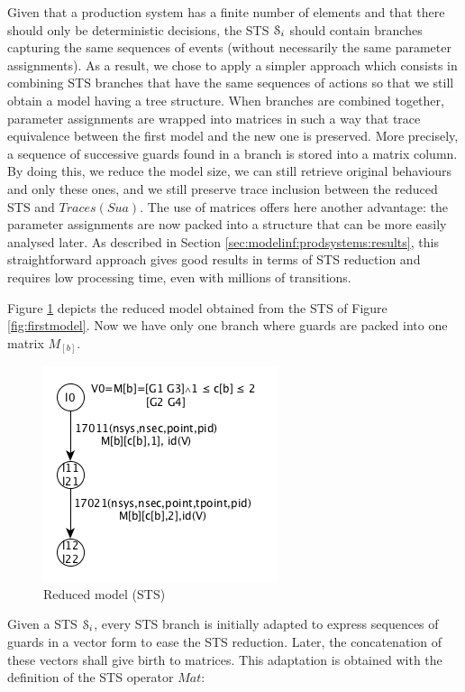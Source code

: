 Given that a production system has a finite number of elements
and that there should only be deterministic decisions, the STS
$\EuScript{S}_i$ should contain branches capturing the same
sequences of events (without necessarily the same parameter
assignments).  As a result, we chose to apply a simpler approach
which consists in combining STS branches that have the same
sequences of actions so that we still obtain a model having a
tree structure. When branches are combined together, parameter
assignments are wrapped into matrices in such a way that trace
equivalence between the first model and the new one is preserved.
More precisely, a sequence of successive guards found in a branch
is stored into a matrix column. By doing this, we reduce the
model size, we can still retrieve original behaviours and only
these ones, and we still preserve trace inclusion between the
reduced STS and $Traces(Sua)$.
The use of matrices offers here another advantage: the parameter
assignments are now packed into a structure that can be more
easily analysed later. As described in Section
\ref{sec:modelinf:prodsystems:results}, this straightforward
approach gives good results in terms of STS reduction and
requires low processing time, even with millions of transitions.

Figure \ref{fig:reduced-model} depicts the reduced model obtained
from the STS of Figure \ref{fig:firstmodel}. Now we have only one
branch where guards are packed into one matrix $M_{[b]}$.

\begin{figure}[H]
  \includegraphics[width=0.5\linewidth]{figures/STS2.png}

	\caption{Reduced model (STS)}
	\label{fig:reduced-model}
\end{figure}

Given a STS $\EuScript{S}_i$, every STS branch is initially
adapted to express sequences of guards in a vector form to ease
the STS reduction. Later, the concatenation of these vectors
shall give birth to matrices. This adaptation is obtained with
the definition of the STS operator $Mat$:

